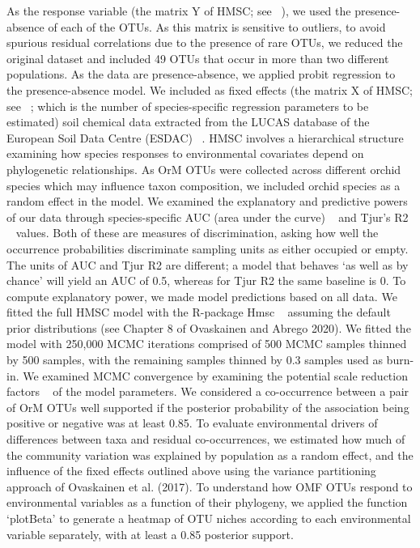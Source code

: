 As the response variable (the matrix Y of HMSC; see ~\citep{ovaskainen2017}), we used the presence-absence of each of the OTUs. As this matrix is sensitive to outliers, to avoid spurious residual correlations due to the presence of rare OTUs, we reduced the original dataset and included 49 OTUs that occur in more than two different populations. As the data are presence-absence, we applied probit regression to the presence-absence model. We included as fixed effects (the matrix X of HMSC; see ~\citep{ovaskainen2017}; which is the number of species-specific regression parameters to be estimated) soil chemical data extracted from the LUCAS database of the European Soil Data Centre (ESDAC) ~\citep{ballabio2019}. HMSC involves a hierarchical structure examining how species responses to environmental covariates depend on phylogenetic relationships. As OrM OTUs were collected across different orchid species which may influence taxon composition, we included orchid species as a random effect in the model.
We examined the explanatory and predictive powers of our data through species-specific AUC (area under the curve) ~\citep{pearce2000} and Tjur’s R2 ~\citep{tjur2009} values. Both of these are measures of discrimination, asking how well the occurrence probabilities discriminate sampling units as either occupied or empty. The units of AUC and Tjur R2 are different; a model that behaves ‘as well as by chance’ will yield an AUC of 0.5, whereas for Tjur R2 the same baseline is 0. To compute explanatory power, we made model predictions based on all data. We fitted the full HMSC model with the R-package Hmsc ~\citep{tikhonov2020} assuming the default prior distributions (see Chapter 8 of Ovaskainen and Abrego 2020). We fitted the model with 250,000 MCMC iterations comprised of 500 MCMC samples thinned by 500 samples, with the remaining samples thinned by 0.3 samples used as burn-in. We examined MCMC convergence by examining the potential scale reduction factors ~\citep{gelman1992} of the model parameters. We considered a co-occurrence between a pair of OrM OTUs well supported if the posterior probability of the association being positive or negative was at least 0.85. To evaluate environmental drivers of differences between taxa and residual co-occurrences, we estimated how much of the community variation was explained by population as a random effect, and the influence of the fixed effects outlined above using the variance partitioning approach of Ovaskainen et al. (2017). To understand how OMF OTUs respond to environmental variables as a function of their phylogeny, we applied the function ‘plotBeta’ to generate a heatmap of OTU niches according to each environmental variable separately, with at least a 0.85 posterior support.

